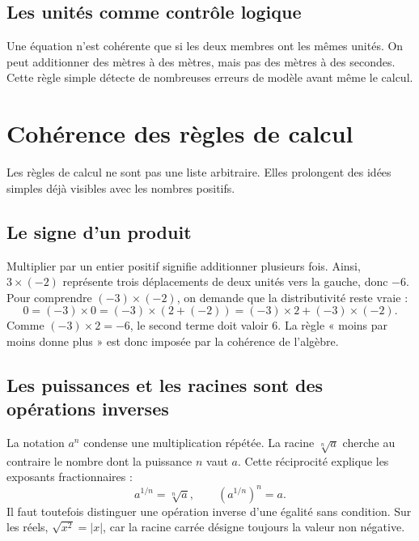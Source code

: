 \documentclass[12pt,a4paper,openany]{book}
\begin{document}
\subsection{Les unités comme contrôle logique}
Une équation n'est cohérente que si les deux membres ont les mêmes unités. On peut additionner des mètres à des mètres, mais pas des mètres à des secondes. Cette règle simple détecte de nombreuses erreurs de modèle avant même le calcul.


\section{Cohérence des règles de calcul}

Les règles de calcul ne sont pas une liste arbitraire. Elles prolongent des idées simples déjà visibles avec les nombres positifs.

\subsection{Le signe d'un produit}
Multiplier par un entier positif signifie additionner plusieurs fois. Ainsi, $3\times(-2)$ représente trois déplacements de deux unités vers la gauche, donc $-6$. Pour comprendre $(-3)\times(-2)$, on demande que la distributivité reste vraie :
\[
0=(-3)\times0=(-3)\times(2+(-2))=(-3)\times2+(-3)\times(-2).
\]
Comme $(-3)\times2=-6$, le second terme doit valoir $6$. La règle « moins par moins donne plus » est donc imposée par la cohérence de l'algèbre.

\begin{center}
\end{center}

\subsection{Les puissances et les racines sont des opérations inverses}
La notation $a^n$ condense une multiplication répétée. La racine $\sqrt[n]{a}$ cherche au contraire le nombre dont la puissance $n$ vaut $a$. Cette réciprocité explique les exposants fractionnaires :
\[
a^{1/n}=\sqrt[n]{a},
\qquad
(a^{1/n})^n=a.
\]
Il faut toutefois distinguer une opération inverse d'une égalité sans condition. Sur les réels, $\sqrt{x^2}=|x|$, car la racine carrée désigne toujours la valeur non négative.
\end{document}
